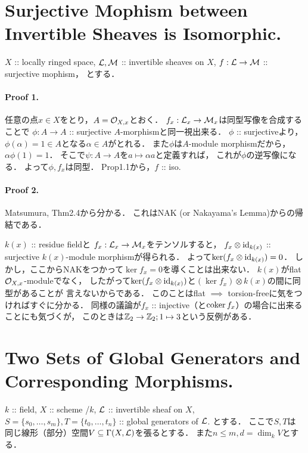 \documentclass[a4paper]{jsarticle}
\begin{document}
\section{Surjective Mophism between Invertible Sheaves is Isomorphic.} %
    $X$ :: locally ringed space,
    $\shL, \shM$ :: invertible sheaves on $X$,
    $f: \shL \to \shM$ :: surjective mophism，
    とする．
    
    \paragraph{Proof 1.}
    任意の点$x \in X$をとり，$A=\shO_{X,x}$とおく．
    $f_x: \shL_x \to \shM_x$は同型写像を合成することで
    $\phi: A \to A$ :: surjective $A$-morphismと同一視出来る．
    $\phi$ :: surjectiveより，
    $\phi(\alpha)=1 \in A$となる$\alpha \in A$がとれる．
    また$\phi$は$A$-module morphismだから，$\alpha \phi(1)=1$．
    そこで$\psi: A \to A$を$a \mapsto \alpha a$と定義すれば，
    これが$\phi$の逆写像になる．
    よって$\phi, f_x$は同型．
    Prop1.1から，$f$ :: iso.

    \paragraph{Proof 2.}
    Matsumura, Thm2.4から分かる．
    これはNAK (or Nakayama's Lemma)からの帰結である．

    \begin{Remark}
        $k(x)$ :: residue fieldと
        $f_x: \shL_x \to \shM_x$をテンソルすると，
        $f_x \otimes \id[k(x)]$ :: surjective $k(x)$-module morphismが得られる．
        よって$\ker (f_x \otimes \id[k(x)])=0$．
        しかし，ここからNAKをつかって$\ker f_x=0$を導くことは出来ない．
        $k(x)$がflat $\shO_{X,x}$-moduleでなく，
        したがって$\ker (f_x \otimes \id[k(x)])$と$(\ker f_x) \otimes k(x)$の間に同型があることが
        言えないからである．
        このことはflat $\implies$ torsion-freeに気をつければすぐに分かる．
        同様の議論が$f_x$ :: injective（と$\coker f_x$）の場合に出来ることにも気づくが，
        このときは$\Z_2 \to \Z_2; 1 \mapsto 3$という反例がある．
    \end{Remark}

\section{Two Sets of Global Generators and Corresponding Morphisms.} %
    $k$ :: field,
    $X$ :: scheme /$k$,
    $\shL$ :: invertible sheaf on $X$,
    $S=\{s_0,\dots,s_m\}, T=\{t_0,\dots,t_n\}$ :: global generators of $\shL$.
    とする．
    ここで$S,T$は
    同じ線形（部分）空間$V \subseteq \Gamma(X, \shL)$を張るとする．
    また$n \leq m, d=\dim_k V$とする．
\end{document}
